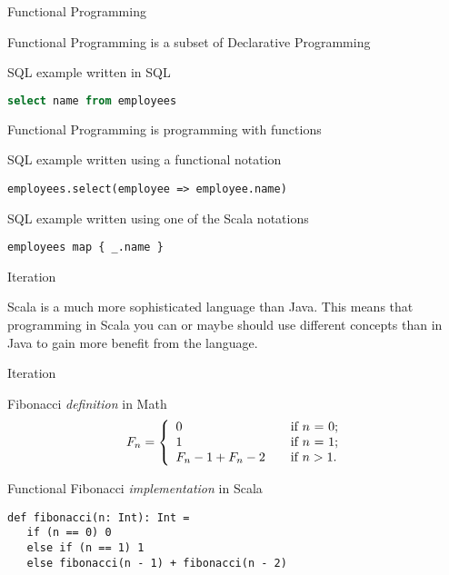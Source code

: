 \begin{frame}[fragile]{Functional Programming}
\begin{center}
Functional Programming is a subset of Declarative Programming
\end{center}
\pause
\begin{exampleblock}{SQL example written in SQL}
\begin{lstlisting}[language=sql]
select name from employees
\end{lstlisting}
\end{exampleblock}
\pause
\begin{center}
Functional Programming is programming with functions
\end{center}
\pause
\begin{exampleblock}{SQL example written using a functional notation}
\begin{lstlisting}
employees.select(employee => employee.name)
\end{lstlisting}
\end{exampleblock}
\pause
\begin{exampleblock}{SQL example written using one of the Scala notations}
\begin{lstlisting}
employees map { _.name }
\end{lstlisting}
\end{exampleblock}
\end{frame}

\begin{frame}[fragile]{Iteration}
\begin{center}
Scala is a much more sophisticated language than Java. This means that
programming in Scala you can or maybe should use different concepts than in Java
to gain more benefit from the language.
\end{center}
\end{frame}

\begin{frame}[fragile]{Iteration}
\begin{exampleblock}{Fibonacci \emph{definition} in Math}
\[
  F_n = \left\{
  \begin{array}{l l}
    	0 & \quad \textrm{if $n$ = 0;}\\
    	1 & \quad \textrm{if $n$ = 1;}\\
    	F_n-1 + F_n-2 & \quad \textrm{if $n > 1$.}\\
  \end{array} \right.
\]
\end{exampleblock}
\pause
\begin{exampleblock}{Functional Fibonacci \emph{implementation} in Scala}
\begin{lstlisting}
def fibonacci(n: Int): Int =
   if (n == 0) 0
   else if (n == 1) 1
   else fibonacci(n - 1) + fibonacci(n - 2)
\end{lstlisting}
\end{exampleblock}
\end{frame}

